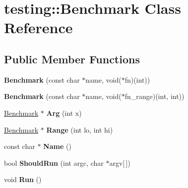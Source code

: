 \hypertarget{classtesting_1_1_benchmark}{}\section{testing\+:\+:Benchmark Class Reference}
\label{classtesting_1_1_benchmark}
\subsection*{Public Member Functions}
\begin{DoxyCompactItemize}
\item 
\mbox{\label{classtesting_1_1_benchmark_a6efcde70cf39012a6dcf92e8b5cfa12f}} 
{\bfseries Benchmark} (const char $\ast$name, void($\ast$fn)(int))
\item 
\mbox{\label{classtesting_1_1_benchmark_ade815a2836cacda5dcb65c14691c1ead}} 
{\bfseries Benchmark} (const char $\ast$name, void($\ast$fn\+\_\+range)(int, int))
\item 
\mbox{\label{classtesting_1_1_benchmark_a306e8f24658d9ac29ab0b385e8e1f563}} 
\hyperlink{classtesting_1_1_benchmark}{Benchmark} $\ast$ {\bfseries Arg} (int x)
\item 
\mbox{\label{classtesting_1_1_benchmark_abb5f843b123c9a2ca572ff837e354010}} 
\hyperlink{classtesting_1_1_benchmark}{Benchmark} $\ast$ {\bfseries Range} (int lo, int hi)
\item 
\mbox{\label{classtesting_1_1_benchmark_ada67cfd59b617a1b9f5a944692594723}} 
const char $\ast$ {\bfseries Name} ()
\item 
\mbox{\label{classtesting_1_1_benchmark_a2a9a4922fdcd9fd8291db3c0958b6bb0}} 
bool {\bfseries Should\+Run} (int argc, char $\ast$argv\mbox{[}$\,$\mbox{]})
\item 
\mbox{\label{classtesting_1_1_benchmark_aba2258980adf0c0e95835d8644168bdc}} 
void {\bfseries Run} ()
\item 
\mbox{\label{classtesting_1_1_benchmark_a6efcde70cf39012a6dcf92e8b5cfa12f}} 

\end{DoxyCompactItemize}
